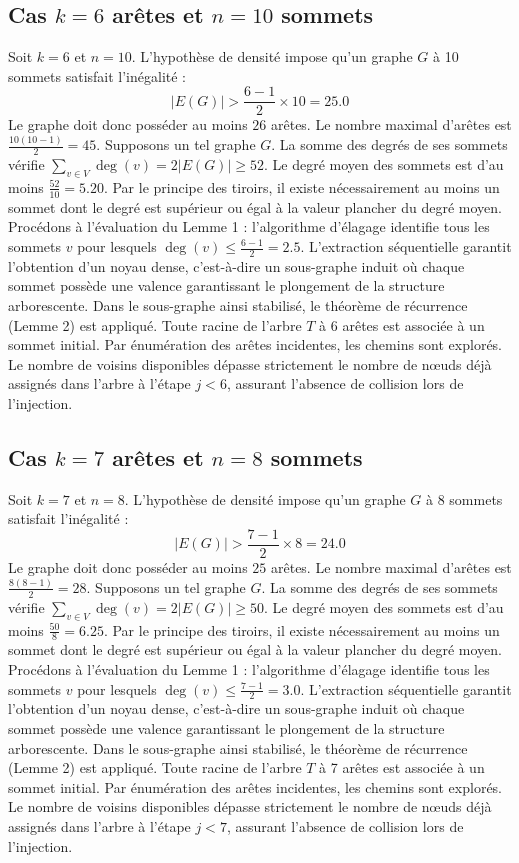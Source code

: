 \documentclass[12pt,a4paper]{article}
\begin{document}
\subsection{Cas $k = 6$ arêtes et $n = 10$ sommets}
Soit $k = 6$ et $n = 10$. L'hypothèse de densité impose qu'un graphe $G$ à 10 sommets satisfait l'inégalité :
$$ |E(G)| > \frac{6-1}{2} \times 10 = 25.0 $$
Le graphe doit donc posséder au moins $26$ arêtes. Le nombre maximal d'arêtes est $\frac{10(10-1)}{2} = 45$.
Supposons un tel graphe $G$. La somme des degrés de ses sommets vérifie $\sum_{v \in V} \deg(v) = 2|E(G)| \geq 52$.
Le degré moyen des sommets est d'au moins $\frac{52}{10} = 5.20$.
Par le principe des tiroirs, il existe nécessairement au moins un sommet dont le degré est supérieur ou égal à la valeur plancher du degré moyen.
Procédons à l'évaluation du Lemme 1 : l'algorithme d'élagage identifie tous les sommets $v$ pour lesquels $\deg(v) \leq \frac{6-1}{2} = 2.5$.
L'extraction séquentielle garantit l'obtention d'un noyau dense, c'est-à-dire un sous-graphe induit où chaque sommet possède une valence garantissant le plongement de la structure arborescente.
Dans le sous-graphe ainsi stabilisé, le théorème de récurrence (Lemme 2) est appliqué. Toute racine de l'arbre $T$ à 6 arêtes est associée à un sommet initial. Par énumération des arêtes incidentes, les chemins sont explorés. Le nombre de voisins disponibles dépasse strictement le nombre de nœuds déjà assignés dans l'arbre à l'étape $j < 6$, assurant l'absence de collision lors de l'injection.

\subsection{Cas $k = 7$ arêtes et $n = 8$ sommets}
Soit $k = 7$ et $n = 8$. L'hypothèse de densité impose qu'un graphe $G$ à 8 sommets satisfait l'inégalité :
$$ |E(G)| > \frac{7-1}{2} \times 8 = 24.0 $$
Le graphe doit donc posséder au moins $25$ arêtes. Le nombre maximal d'arêtes est $\frac{8(8-1)}{2} = 28$.
Supposons un tel graphe $G$. La somme des degrés de ses sommets vérifie $\sum_{v \in V} \deg(v) = 2|E(G)| \geq 50$.
Le degré moyen des sommets est d'au moins $\frac{50}{8} = 6.25$.
Par le principe des tiroirs, il existe nécessairement au moins un sommet dont le degré est supérieur ou égal à la valeur plancher du degré moyen.
Procédons à l'évaluation du Lemme 1 : l'algorithme d'élagage identifie tous les sommets $v$ pour lesquels $\deg(v) \leq \frac{7-1}{2} = 3.0$.
L'extraction séquentielle garantit l'obtention d'un noyau dense, c'est-à-dire un sous-graphe induit où chaque sommet possède une valence garantissant le plongement de la structure arborescente.
Dans le sous-graphe ainsi stabilisé, le théorème de récurrence (Lemme 2) est appliqué. Toute racine de l'arbre $T$ à 7 arêtes est associée à un sommet initial. Par énumération des arêtes incidentes, les chemins sont explorés. Le nombre de voisins disponibles dépasse strictement le nombre de nœuds déjà assignés dans l'arbre à l'étape $j < 7$, assurant l'absence de collision lors de l'injection.
\end{document}
